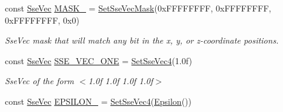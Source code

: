 \begin{DoxyCompactItemize}
const \hyperlink{namespacegofxmath_a634570ddcd2496053ee966227080e02f}{Sse\+Vec} \hyperlink{namespacegofxmath_a557ea8335b7d1d30471f67b1853b74c6}{M\+A\+S\+K\+\_} = \hyperlink{namespacegofxmath_a00fde6f7347c3610a9b6184079d6490e}{Set\+Sse\+Vec\+Mask}(0x\+F\+F\+F\+F\+F\+F\+F\+F, 0x\+F\+F\+F\+F\+F\+F\+F\+F, 0x\+F\+F\+F\+F\+F\+F\+F\+F, 0x0)
\begin{DoxyCompactList}\small\item\em Sse\+Vec mask that will match any bit in the x, y, or z-\/coordinate positions. \end{DoxyCompactList}\item 
\hypertarget{namespacegofxmath_a48e3accf6d256a116c69cc88c4c733b1}{}const \hyperlink{namespacegofxmath_a634570ddcd2496053ee966227080e02f}{Sse\+Vec} \hyperlink{namespacegofxmath_a48e3accf6d256a116c69cc88c4c733b1}{S\+S\+E\+\_\+\+V\+E\+C\+\_\+\+O\+N\+E} = \hyperlink{namespacegofxmath_a5c69ea49b97ced58947fec384517442d}{Set\+Sse\+Vec4}(1.\+0f)\label{namespacegofxmath_a48e3accf6d256a116c69cc88c4c733b1}

\begin{DoxyCompactList}\small\item\em Sse\+Vec of the form $<$1.\+0f 1.\+0f 1.\+0f 1.\+0f$>$ \end{DoxyCompactList}\item 
\hypertarget{namespacegofxmath_ae3f018845f0d6aa6071757caea3246af}{}const \hyperlink{namespacegofxmath_a634570ddcd2496053ee966227080e02f}{Sse\+Vec} \hyperlink{namespacegofxmath_ae3f018845f0d6aa6071757caea3246af}{E\+P\+S\+I\+L\+O\+N\+\_} = \hyperlink{namespacegofxmath_a5c69ea49b97ced58947fec384517442d}{Set\+Sse\+Vec4}(\hyperlink{group___scalar_math_consts_ga88a517d09326cefa42e5a854384217dd}{Epsilon}())\label{namespacegofxmath_ae3f018845f0d6aa6071757caea3246af}


\end{DoxyCompactItemize}
